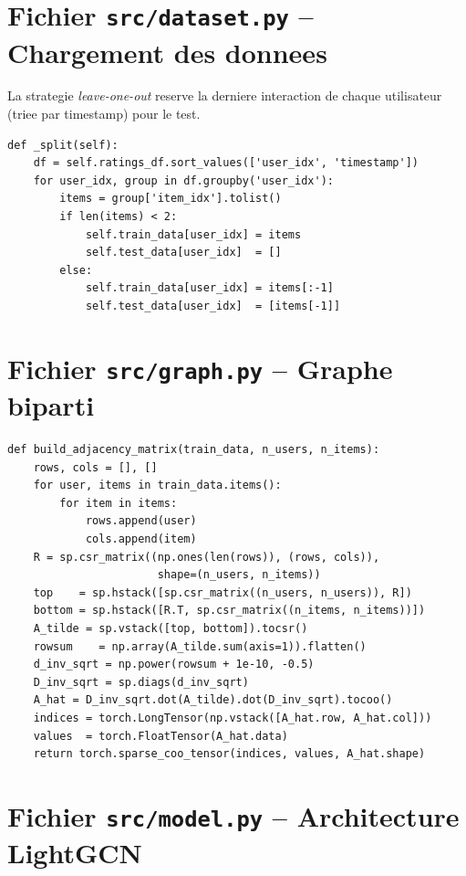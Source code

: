 \documentclass[12pt,a4paper]{report}
\begin{document}
\section{Fichier \texttt{src/dataset.py} -- Chargement des donnees}

La strategie \textit{leave-one-out} reserve la derniere interaction
de chaque utilisateur (triee par timestamp) pour le test.

\begin{lstlisting}[caption={Strategie leave-one-out},label=lst:dataset]
def _split(self):
    df = self.ratings_df.sort_values(['user_idx', 'timestamp'])
    for user_idx, group in df.groupby('user_idx'):
        items = group['item_idx'].tolist()
        if len(items) < 2:
            self.train_data[user_idx] = items
            self.test_data[user_idx]  = []
        else:
            self.train_data[user_idx] = items[:-1]
            self.test_data[user_idx]  = [items[-1]]
\end{lstlisting}

\section{Fichier \texttt{src/graph.py} -- Graphe biparti}

\begin{lstlisting}[caption={Construction de A\_hat normalise},label=lst:graph]
def build_adjacency_matrix(train_data, n_users, n_items):
    rows, cols = [], []
    for user, items in train_data.items():
        for item in items:
            rows.append(user)
            cols.append(item)
    R = sp.csr_matrix((np.ones(len(rows)), (rows, cols)),
                       shape=(n_users, n_items))
    top    = sp.hstack([sp.csr_matrix((n_users, n_users)), R])
    bottom = sp.hstack([R.T, sp.csr_matrix((n_items, n_items))])
    A_tilde = sp.vstack([top, bottom]).tocsr()
    rowsum    = np.array(A_tilde.sum(axis=1)).flatten()
    d_inv_sqrt = np.power(rowsum + 1e-10, -0.5)
    D_inv_sqrt = sp.diags(d_inv_sqrt)
    A_hat = D_inv_sqrt.dot(A_tilde).dot(D_inv_sqrt).tocoo()
    indices = torch.LongTensor(np.vstack([A_hat.row, A_hat.col]))
    values  = torch.FloatTensor(A_hat.data)
    return torch.sparse_coo_tensor(indices, values, A_hat.shape)
\end{lstlisting}

\section{Fichier \texttt{src/model.py} -- Architecture LightGCN}
\end{document}
